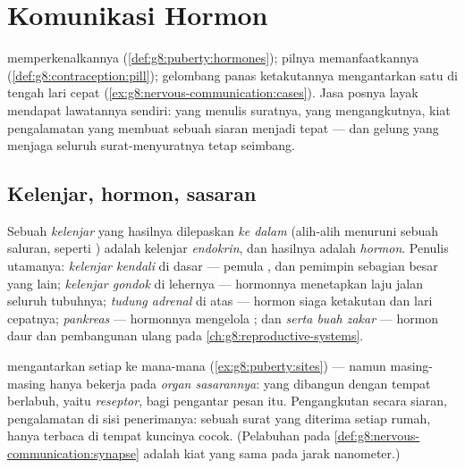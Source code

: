 \chapter{Komunikasi Hormon}\label{ch:g8:hormonal-communication}

 memperkenalkannya
(\cref{def:g8:puberty:hormones}); pilnya memanfaatkannya
(\cref{def:g8:contraception:pill}); gelombang panas
ketakutannya mengantarkan satu di tengah lari cepat
(\cref{ex:g8:nervous-communication:cases}). Jasa posnya
layak mendapat lawatannya sendiri:  yang menulis
suratnya,  yang mengangkutnya, kiat pengalamatan yang
membuat sebuah siaran menjadi tepat --- dan gelung  yang menjaga seluruh surat-menyuratnya tetap seimbang.

\section{Kelenjar, hormon, sasaran}

\begin{definition}\label{def:g8:hormonal-communication:glands}
Sebuah \emph{kelenjar} yang hasilnya
dilepaskan \emph{ke dalam } (alih-alih menuruni sebuah
saluran, seperti ) adalah kelenjar
\emph{endokrin}, dan hasilnya adalah
\emph{hormon}. Penulis utamanya:
\emph{kelenjar kendali} di dasar  --- pemula
, dan pemimpin sebagian besar yang lain;
\emph{kelenjar gondok} di lehernya --- hormonnya menetapkan
laju jalan seluruh tubuhnya; \emph{tudung adrenal} di atas
 --- hormon siaga ketakutan dan lari cepatnya;
\emph{pankreas} --- hormonnya mengelola  ;
dan \emph{ serta buah zakar} --- hormon daur dan
pembangunan ulang pada \cref{ch:g8:reproductive-systems}.
\end{definition}

\begin{proposition}\label{prop:g8:hormonal-communication:address}
 mengantarkan setiap  ke mana-mana
(\cref{ex:g8:puberty:sites}) --- namun masing-masing hanya
bekerja pada \emph{organ sasarannya}:
 yang dibangun dengan tempat berlabuh, yaitu
\emph{reseptor}, bagi pengantar pesan itu. Pengangkutan
secara siaran, pengalamatan di sisi penerimanya: sebuah
surat yang diterima setiap rumah, hanya terbaca di tempat
kuncinya cocok. (Pelabuhan pada 
\cref{def:g8:nervous-communication:synapse} adalah kiat yang
sama pada jarak nanometer.)
\end{proposition}
\admitted

